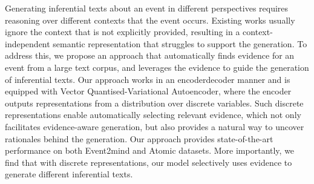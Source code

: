 Generating inferential texts about an event in different perspectives requires reasoning over different contexts that the event occurs. Existing works usually ignore the context that is not explicitly provided, resulting in a context-independent semantic representation that struggles to support the generation. To address this, we propose an approach that  automatically finds evidence for an event from a large text corpus, and leverages the evidence to guide the generation of inferential texts. Our approach works in an encoderdecoder manner and is equipped with Vector Quantised-Variational Autoencoder, where the encoder outputs representations from a distribution over discrete variables. Such discrete representations enable automatically selecting relevant evidence, which not only facilitates evidence-aware generation, but also provides a natural way to uncover rationales behind the generation. Our approach provides state-of-the-art performance on both Event2mind and Atomic datasets. More importantly, we find that with discrete representations, our model selectively uses evidence to generate different inferential texts.
